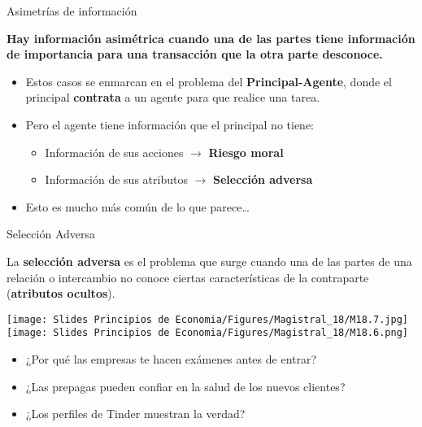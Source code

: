 \documentclass{beamer}
\begin{document}
\begin{frame}{Asimetrías de información}
    \begin{boxB}
        \centering
        \textbf{Hay información asimétrica cuando una de las partes tiene información de importancia para una transacción que la otra parte desconoce.}
    \end{boxB}
    \begin{itemize}
        \item Estos casos se enmarcan en el problema del \textbf{Principal-Agente}, donde el principal \textbf{contrata} a un agente para que realice una tarea.
        \item Pero el agente tiene información que el principal no tiene:
        \begin{itemize}
        \item Información de sus acciones $\rightarrow$ \textbf{Riesgo moral}
        \item Información de sus atributos $\rightarrow$ \textbf{Selección adversa}
        \end{itemize}
        \item Esto es mucho más común de lo que parece\dots
    \end{itemize}
\end{frame}

\begin{frame}{Selección Adversa}
    \begin{boxB}
        \centering
        La \textbf{selección adversa} es el problema que surge cuando una de las partes de una relación o intercambio no conoce ciertas características de la contraparte (\textbf{atributos ocultos}).
    \end{boxB}
    \vspace{2mm}
    \centering
    \texttt{[image: Slides Principios de Economia/Figures/Magistral\_18/M18.7.jpg]} \hspace{2mm}
    \texttt{[image: Slides Principios de Economia/Figures/Magistral\_18/M18.6.png]}
    \vspace{2mm}
    \begin{itemize}
        \item ¿Por qué las empresas te hacen exámenes antes de entrar?
        \item ¿Las prepagas pueden confiar en la salud de los nuevos clientes?
        \item ¿Los perfiles de Tinder muestran la verdad?
    \end{itemize}
\end{frame}
\end{document}
